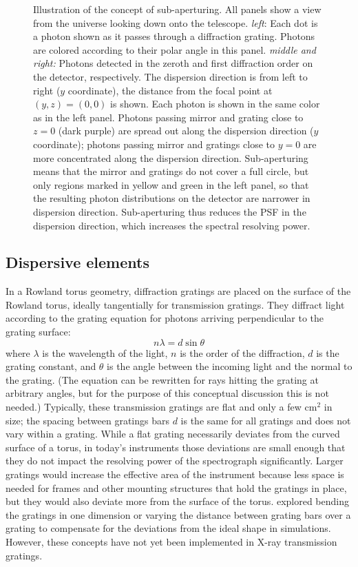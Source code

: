 \documentclass[linenumbers]{aastex631}
\begin{document}
\begin{figure}
\caption{
    Illustration of the concept of sub-aperturing. All panels show a view from the universe looking down onto the telescope. \emph{left}: Each dot is a photon shown as it passes through a diffraction grating. Photons are colored according to their polar angle in this panel. \emph{middle and right:} Photons detected in the zeroth and first diffraction order on the detector, respectively. The dispersion direction is from left to right ($y$ coordinate), the distance from the focal point at $(y, z) = (0, 0)$ is shown. Each photon is shown in the same color as in the left panel. Photons passing mirror and grating close to $z=0$ (dark purple) are spread out along the dispersion direction ($y$ coordinate); photons passing mirror and gratings close to $y=0$ are more concentrated along the dispersion direction. Sub-aperturing means that the mirror and gratings do not cover a full circle, but only regions marked in yellow and green in the left panel, so that the resulting photon distributions on the detector are narrower in dispersion direction. Sub-aperturing thus reduces the PSF in the dispersion direction, which increases the spectral resolving power.}
\label{fig:subaperture}
\end{figure}

\subsection{Dispersive elements}
In a Rowland torus geometry, diffraction gratings are placed on the surface of the Rowland torus, ideally tangentially for transmission gratings. They diffract light according to the grating equation for photons arriving perpendicular to the grating surface:
\begin{equation}
n \lambda = d \sin \theta \label{eqn:diffraction}
\end{equation}
where $\lambda$ is the wavelength of the light, $n$ is the order of the diffraction, $d$ is the grating constant, and $\theta$ is the angle between the incoming light and the normal to the grating. (The equation can be rewritten for rays hitting the grating at arbitrary angles, but for the purpose of this conceptual discussion this is not needed.)
Typically, these transmission gratings are flat and only a few cm$^2$ in size; the spacing between gratings bars $d$ is the same for all gratings and does not vary within a grating. While a flat grating necessarily deviates from the curved surface of a torus, in today's instruments those deviations are small enough that they do not impact the resolving power of the spectrograph significantly. Larger gratings would increase the effective area of the instrument because less space is needed for frames and other mounting structures that hold the gratings in place, but they would also deviate more from the surface of the torus. \citet{2020SPIE11444E..88G} explored bending the gratings in one dimension or varying the distance between grating bars over a grating to compensate for the deviations from the ideal shape in simulations. However, these concepts have not yet been implemented in X-ray transmission gratings.
\end{document}
